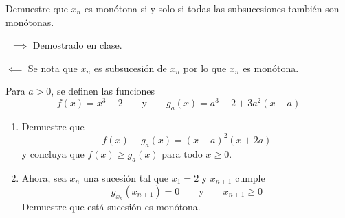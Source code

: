 \documentclass{ayudantia}
\begin{document}
\begin{prob}
    Demuestre que \(x_n\) es monótona si y solo si todas las subsucesiones también son monótonas.
\end{prob}

\begin{ans}
    \begin{sol}\
        \(\implies\) Demostrado en clase.

        \(\impliedby\) Se nota que \(x_n\) es subsucesión de \(x_n\) por lo que \(x_n\) es monótona.
    \end{sol}
\end{ans}


\begin{prob}
    Para \(a>0\), se definen las funciones
    \begin{equation*}
        f(x)=x^3-2\qquad\text{y}\qquad g_a(x)=a^3-2+3a^2(x-a)
    \end{equation*}
    \begin{enumerate}[label=(\alph*)]
        \item Demuestre que
              \begin{equation*}
                  f(x)-g_a(x)=(x-a)^2(x+2a)
              \end{equation*}
              y concluya que \(f(x)\geq g_a(x)\) para todo \(x\geq 0\).
        \item Ahora, sea \(x_n\) una sucesión tal que \(x_1=2\) y \(x_{n+1}\) cumple
              \begin{equation*}
                  g_{x_n}(x_{n+1})=0\qquad\text{y}\qquad x_{n+1}\geq0
              \end{equation*}
              Demuestre que está sucesión es monótona.
    \end{enumerate}
\end{prob}
\end{document}
